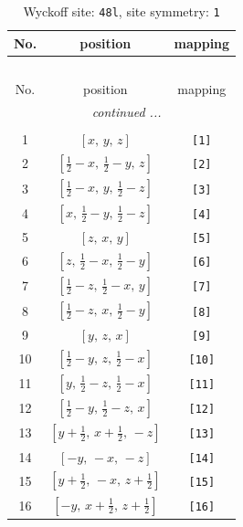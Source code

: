 \documentclass[fleqn,8pt]{jsarticle}
\begin{document}
\begin{longtable}{ccc}
\caption{Wyckoff site: {\tt 48l}, site symmetry: {\tt 1}}
 \\
 \hline \hline
No. & position & mapping \\ \hline \endfirsthead

\multicolumn{2}{l}{\tablename\ \thetable{}} \\
 \hline \hline
No. & position & mapping \\ \hline \endhead

 \hline \hline
\multicolumn{2}{r}{\footnotesize\it continued ...} \\ \endfoot

 \hline \hline
\multicolumn{2}{r}{} \\ \endlastfoot

1 & $\left[ x,\, y,\, z \right]$ & {\tt [1]} \\ \hline
2 & $\left[ \frac{1}{2} - x,\, \frac{1}{2} - y,\, z \right]$ & {\tt [2]} \\ \hline
3 & $\left[ \frac{1}{2} - x,\, y,\, \frac{1}{2} - z \right]$ & {\tt [3]} \\ \hline
4 & $\left[ x,\, \frac{1}{2} - y,\, \frac{1}{2} - z \right]$ & {\tt [4]} \\ \hline
5 & $\left[ z,\, x,\, y \right]$ & {\tt [5]} \\ \hline
6 & $\left[ z,\, \frac{1}{2} - x,\, \frac{1}{2} - y \right]$ & {\tt [6]} \\ \hline
7 & $\left[ \frac{1}{2} - z,\, \frac{1}{2} - x,\, y \right]$ & {\tt [7]} \\ \hline
8 & $\left[ \frac{1}{2} - z,\, x,\, \frac{1}{2} - y \right]$ & {\tt [8]} \\ \hline
9 & $\left[ y,\, z,\, x \right]$ & {\tt [9]} \\ \hline
10 & $\left[ \frac{1}{2} - y,\, z,\, \frac{1}{2} - x \right]$ & {\tt [10]} \\ \hline
11 & $\left[ y,\, \frac{1}{2} - z,\, \frac{1}{2} - x \right]$ & {\tt [11]} \\ \hline
12 & $\left[ \frac{1}{2} - y,\, \frac{1}{2} - z,\, x \right]$ & {\tt [12]} \\ \hline
13 & $\left[ y + \frac{1}{2},\, x + \frac{1}{2},\, - z \right]$ & {\tt [13]} \\ \hline
14 & $\left[ - y,\, - x,\, - z \right]$ & {\tt [14]} \\ \hline
15 & $\left[ y + \frac{1}{2},\, - x,\, z + \frac{1}{2} \right]$ & {\tt [15]} \\ \hline
16 & $\left[ - y,\, x + \frac{1}{2},\, z + \frac{1}{2} \right]$ & {\tt [16]} \\ \hline

\end{longtable}
\end{document}
